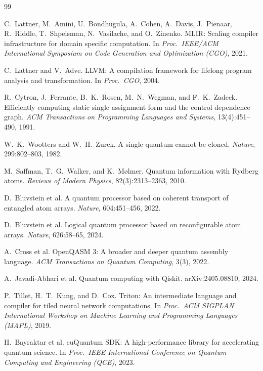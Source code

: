 \documentclass[11pt]{article}
\begin{document}
\begin{thebibliography}{99}

 C.~Lattner, M.~Amini, U.~Bondhugula, A.~Cohen, A.~Davis, J.~Pienaar, R.~Riddle, T.~Shpeisman,
N.~Vasilache, and O.~Zinenko. MLIR: Scaling compiler infrastructure for domain specific computation. In
\emph{Proc.\ IEEE/ACM International Symposium on Code Generation and Optimization (CGO)}, 2021.

 C.~Lattner and V.~Adve. LLVM: A compilation framework for lifelong program analysis and
transformation. In \emph{Proc.\ CGO}, 2004.

 R.~Cytron, J.~Ferrante, B.~K.~Rosen, M.~N.~Wegman, and F.~K.~Zadeck. Efficiently computing
static single assignment form and the control dependence graph. \emph{ACM Transactions on Programming Languages and
Systems}, 13(4):451--490, 1991.

 W.~K.~Wootters and W.~H.~Zurek. A single quantum cannot be cloned. \emph{Nature},
299:802--803, 1982.

 M.~Saffman, T.~G.~Walker, and K.~M{\o}lmer. Quantum information with Rydberg atoms.
\emph{Reviews of Modern Physics}, 82(3):2313--2363, 2010.

 D.~Bluvstein et al. A quantum processor based on coherent transport of entangled atom
arrays. \emph{Nature}, 604:451--456, 2022.

 D.~Bluvstein et al. Logical quantum processor based on reconfigurable atom arrays.
\emph{Nature}, 626:58--65, 2024.

 A.~Cross et al. OpenQASM 3: A broader and deeper quantum assembly language. \emph{ACM
Transactions on Quantum Computing}, 3(3), 2022.

 A.~Javadi-Abhari et al. Quantum computing with Qiskit. arXiv:2405.08810, 2024.

 P.~Tillet, H.~T.~Kung, and D.~Cox. Triton: An intermediate language and compiler for tiled neural
network computations. In \emph{Proc.\ ACM SIGPLAN International Workshop on Machine Learning and Programming
Languages (MAPL)}, 2019.

 H.~Bayraktar et al. cuQuantum SDK: A high-performance library for accelerating quantum science.
In \emph{Proc.\ IEEE International Conference on Quantum Computing and Engineering (QCE)}, 2023.

\end{thebibliography}
\end{document}
